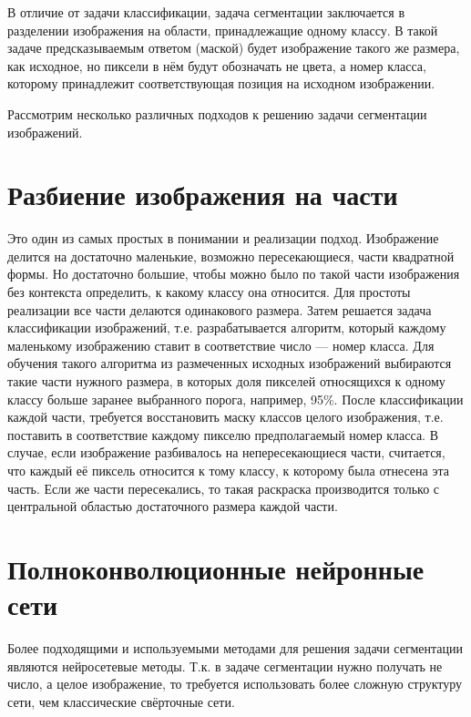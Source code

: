 В отличие от задачи классификации, задача сегментации заключается в разделении
изображения на области, принадлежащие одному классу. В такой задаче
предсказываемым ответом (маской) будет изображение такого же размера, как
исходное, но пиксели в нём будут обозначать не цвета, а номер класса, которому
принадлежит соответствующая позиция на исходном изображении.

Рассмотрим несколько различных подходов к решению задачи сегментации
изображений.

\section*{Разбиение изображения на части}
Это один из самых простых в понимании и реализации подход. Изображение делится
на достаточно маленькие, возможно пересекающиеся, части квадратной формы. Но
достаточно большие, чтобы можно было по такой части изображения без контекста
определить, к какому классу она относится. Для простоты реализации все части
делаются одинакового размера. Затем решается задача классификации изображений,
т.е. разрабатывается алгоритм, который каждому маленькому изображению ставит в
соответствие число --- номер класса. Для обучения такого алгоритма из
размеченных исходных изображений выбираются такие части нужного размера, в
которых доля пикселей относящихся к одному классу больше заранее выбранного
порога, например, 95\%. После классификации каждой части, требуется восстановить
маску классов целого изображения, т.е. поставить в соответствие каждому пикселю
предполагаемый номер класса. В случае, если изображение разбивалось на
непересекающиеся части, считается, что каждый её пиксель относится к тому
классу, к которому была отнесена эта часть. Если же части пересекались, то такая
раскраска производится только с центральной областью достаточного размера каждой
части.

\section*{Полноконволюционные нейронные сети}
Более подходящими и используемыми методами для решения задачи сегментации
являются нейросетевые методы. Т.к. в задаче сегментации нужно получать не число,
а целое изображение, то требуется использовать более сложную структуру сети, чем
классические свёрточные сети.

